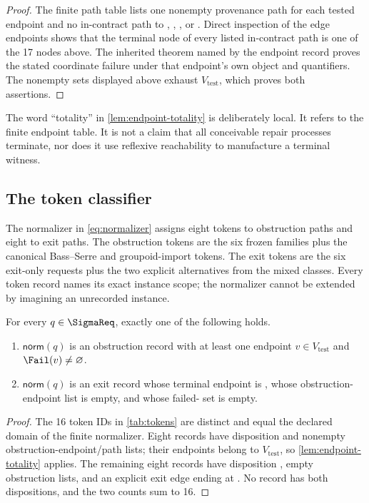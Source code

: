 \begin{proof}
The finite path table lists one nonempty provenance path for each tested
endpoint and no in-contract path to , , , or
.  Direct inspection of the edge endpoints shows that the terminal
node of every listed in-contract path is one of the 17 nodes above.  The
inherited theorem named by the endpoint record proves the stated coordinate
failure under that endpoint's own object and quantifiers.  The nonempty sets
displayed above exhaust $V_{\mathrm{test}}$, which proves both assertions.
\end{proof}

The word ``totality'' in \cref{lem:endpoint-totality} is deliberately local.
It refers to the finite endpoint table.  It is not a claim that all conceivable
repair processes terminate, nor does it use reflexive reachability to manufacture
a terminal witness.

\subsection{The token classifier}

The normalizer in \cref{eq:normalizer} assigns eight tokens to obstruction
paths and eight to exit paths.  The obstruction tokens are the six frozen
families plus the canonical Bass--Serre and groupoid-import tokens.  The exit
tokens are the six exit-only requests plus the two explicit alternatives from
the mixed classes.  Every token record names its exact instance scope; the
normalizer cannot be extended by imagining an unrecorded instance.

\begin{samepage}
\begin{proposition}
\label{prop:token-totality}
For every $q\in\SigmaReq$, exactly one of the following holds.
\begin{enumerate}[nosep]
  \item $\mathsf{norm}(q)$ is an obstruction record with at least one endpoint
  $v\in V_{\mathrm{test}}$ and $\Fail(v)\ne\varnothing$.
  \item $\mathsf{norm}(q)$ is an exit record whose terminal endpoint is
  , whose obstruction-endpoint list is empty, and whose failed-\Good{}
  set is empty.
\end{enumerate}
\end{proposition}
\end{samepage}

\begin{proof}
The 16 token IDs in \cref{tab:tokens} are distinct and equal the declared
domain of the finite normalizer.  Eight records have disposition
\Obstructed{} and nonempty obstruction-endpoint/path lists; their endpoints
belong to $V_{\mathrm{test}}$, so \cref{lem:endpoint-totality} applies.  The
remaining eight records have disposition \Exit{}, empty obstruction lists, and
an explicit exit edge ending at .  No record has both dispositions,
and the two counts sum to 16.
\end{proof}

